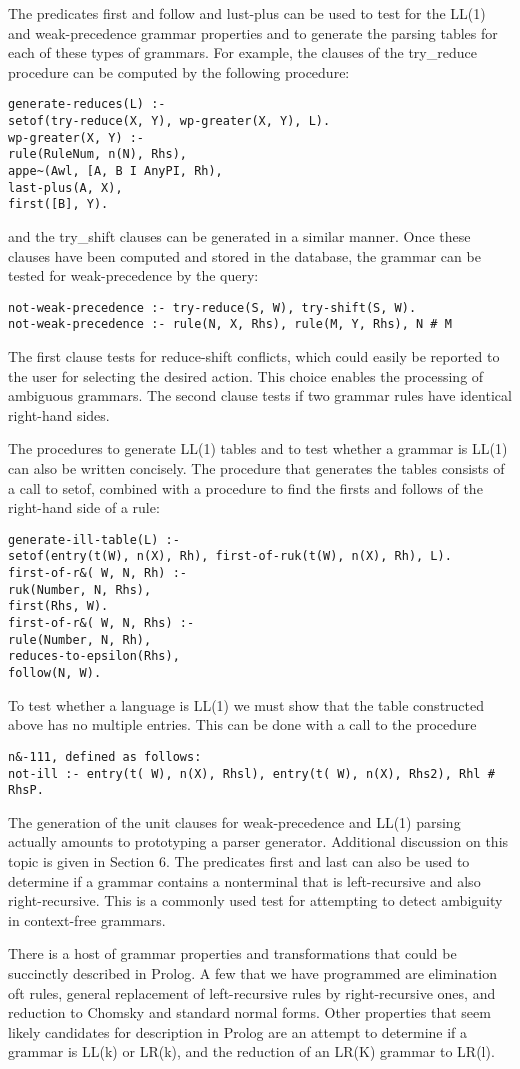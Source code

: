 The predicates first and follow and lust-plus can be used to test for the LL(1)
and weak-precedence grammar properties and to generate the parsing tables for
each of these types of grammars. For example, the clauses of the try\_reduce
procedure can be computed by the following procedure:
\begin{verbatim}
generate-reduces(L) :-
setof(try-reduce(X, Y), wp-greater(X, Y), L).
wp-greater(X, Y) :-
rule(RuleNum, n(N), Rhs),
appe~(Awl, [A, B I AnyPI, Rh),
last-plus(A, X),
first([B], Y). 
\end{verbatim}
and the try\_shift clauses can be generated in a similar manner. Once these
clauses have been computed and stored in the database, the grammar can be tested for
weak-precedence by the query:
\begin{verbatim}
not-weak-precedence :- try-reduce(S, W), try-shift(S, W).
not-weak-precedence :- rule(N, X, Rhs), rule(M, Y, Rhs), N # M 
\end{verbatim}
The first clause tests for reduce-shift conflicts, which could easily be reported to
the user for selecting the desired action. This choice enables the processing of
ambiguous grammars. The second clause tests if two grammar rules have identical
right-hand sides. 

The procedures to generate LL(1) tables and to test whether a grammar is
LL(1) can also be written concisely. The procedure that generates the tables
consists of a call to setof, combined with a procedure to find the firsts and follows
of the right-hand side of a rule:
\begin{verbatim}
generate-ill-table(L) :-
setof(entry(t(W), n(X), Rh), first-of-ruk(t(W), n(X), Rh), L).
first-of-r&( W, N, Rh) :-
ruk(Number, N, Rhs),
first(Rhs, W).
first-of-r&( W, N, Rhs) :-
rule(Number, N, Rh),
reduces-to-epsilon(Rhs),
follow(N, W). 
\end{verbatim}
To test whether a language is LL(1) we must show that the table constructed
above has no multiple entries. This can be done with a call to the procedure
\begin{verbatim}
n&-111, defined as follows:
not-ill :- entry(t( W), n(X), Rhsl), entry(t( W), n(X), Rhs2), Rhl # RhsP.
\end{verbatim}

The generation of the unit clauses for weak-precedence and LL(1) parsing
actually amounts to prototyping a parser generator. Additional discussion on this
topic is given in Section 6. The predicates first and last can also be used to
determine if a grammar contains a nonterminal that is left-recursive and also
right-recursive. This is a commonly used test for attempting to detect ambiguity
in context-free grammars. 

There is a host of grammar properties and transformations that could be
succinctly described in Prolog. A few that we have programmed are elimination
oft rules, general replacement of left-recursive rules by right-recursive ones, and
reduction to Chomsky and standard normal forms. Other properties that seem
likely candidates for description in Prolog are an attempt to determine if a
grammar is LL(k) or LR(k), and the reduction of an LR(K) grammar to LR(l). 

